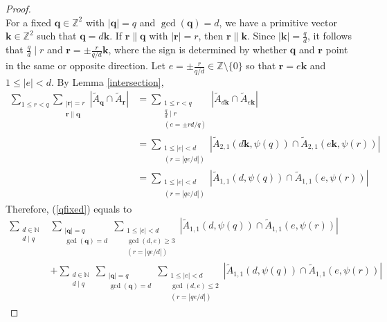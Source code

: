 \documentclass[reqno]{amsart}
\theoremstyle{definition}
\theoremstyle{remark}
\begin{document}
\begin{proof}
\begin{equation}
    \end{equation}
    For a fixed $\mathbf{q} \in \mathbb{Z}^2$ with $|\mathbf{q}| = q$ and $\gcd(\mathbf{q}) = d$, we have a primitive vector $\mathbf{k} \in \mathbb{Z}^2$ such that $\mathbf{q} = d\mathbf{k}$. If $\mathbf{r} \parallel \mathbf{q}$ with $|\mathbf{r}| =r$, then $\mathbf{r} \parallel \mathbf{k}$. Since $|\mathbf{k}| = \frac{q}{d}$, it follows that $\frac{q}{d} \mid r$ and $\mathbf{r} = \pm \frac{r}{q/d} \mathbf{k}$, where the sign is determined by whether $\mathbf{q}$ and $\mathbf{r}$ point in the same or opposite direction. Let $e = \pm \frac{r}{q/d} \in \mathbb{Z} \setminus \{0\}$ so that $\mathbf{r} = e \mathbf{k}$ and $1 \leq |e|<d$. By Lemma \ref{intersection},
    \begin{align*}
        \sum_{1\leq r<q} \sum_{\substack{|\mathbf{r}| = r \\ \mathbf{r} \parallel \mathbf{q}}} |\tilde A_\mathbf q \cap \tilde A_\mathbf r| &= \sum_{\substack{1 \leq r <q \\ \frac{q}{d} \mid r \\ (e = \pm rd/q)}} |\tilde A_{d\mathbf{k}} \cap \tilde A_{e\mathbf{k}}|\\
        &= \sum_{\substack{1 \leq |e| < d \\ (r=|qe/d|)}} |\tilde A_{2,1}(d\mathbf{k}, \psi(q)) \cap \tilde A_{2,1}(e\mathbf{k}, \psi(r))| \\
        &= \sum_{\substack{1 \leq |e| < d \\ (r=|qe/d|)}} |\tilde A_{1,1}(d, \psi(q)) \cap \tilde A_{1,1}(e, \psi(r))|
    \end{align*}
    Therefore, (\ref{qfixed}) equals to
    \begin{equation}\label{twosums}
        \begin{aligned}
            \sum_{\substack{d \in \mathbb{N} \\ d \mid q}} &\sum_{\substack{|\mathbf{q}|= q \\ \gcd(\mathbf{q}) = d}} \sum_{\substack{1 \leq |e| < d \\ \gcd(d,e) \geq 3 \\ (r=|qe/d|)}} |\tilde A_{1,1}(d, \psi(q)) \cap \tilde A_{1,1}(e, \psi(r))| \\
            &+ \sum_{\substack{d \in \mathbb{N} \\ d \mid q}} \sum_{\substack{|\mathbf{q}|= q \\ \gcd(\mathbf{q}) = d}} \sum_{\substack{1 \leq |e| < d \\ \gcd(d,e) \leq 2 \\ (r=|qe/d|)}} |\tilde A_{1,1}(d, \psi(q)) \cap \tilde A_{1,1}(e, \psi(r))|
        \end{aligned}
    \end{equation}


\end{proof}
\end{document}
